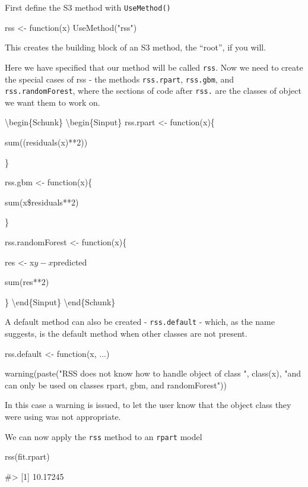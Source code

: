 First define the S3 method with \texttt{UseMethod()}

\begin{Schunk}
\begin{Sinput}
rss <- function(x) UseMethod("rss")
\end{Sinput}
\end{Schunk}

This creates the building block of an S3 method, the ``root'', if you
will.

Here we have specified that our method will be called \texttt{rss}. Now
we need to create the special cases of rss - the methods
\texttt{rss.rpart}, \texttt{rss.gbm}, and \texttt{rss.randomForest},
where the sections of code after \texttt{rss.} are the classes of object
we want them to work on.

\textbackslash{}begin\{Schunk\} \textbackslash{}begin\{Sinput\}
rss.rpart \textless{}- function(x)\{

sum((residuals(x)**2))

\}

rss.gbm \textless{}- function(x)\{

sum(x\$residuals**2)

\}

rss.randomForest \textless{}- function(x)\{

res \textless{}- x\(y - x\)predicted

sum(res**2)

\} \textbackslash{}end\{Sinput\} \textbackslash{}end\{Schunk\}

A default method can also be created - \texttt{rss.default} - which, as
the name suggests, is the default method when other classes are not
present.

\begin{Schunk}
\begin{Sinput}
rss.default <- function(x, ...){
  
  warning(paste("RSS does not know how to handle object of class ", class(x), "and can only be used on classes rpart, gbm, and randomForest"))
          
          }
\end{Sinput}
\end{Schunk}

In this case a warning is issued, to let the user know that the object
class they were using was not appropriate.

We can now apply the \texttt{rss} method to an \texttt{rpart} model

\begin{Schunk}
\begin{Sinput}
rss(fit.rpart)
\end{Sinput}
\begin{Soutput}
#> [1] 10.17245
\end{Soutput}
\end{Schunk}

